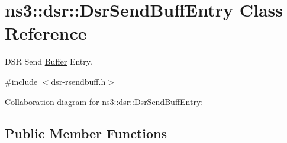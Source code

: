 \hypertarget{classns3_1_1dsr_1_1DsrSendBuffEntry}{}\section{ns3\+:\+:dsr\+:\+:Dsr\+Send\+Buff\+Entry Class Reference}
\label{classns3_1_1dsr_1_1DsrSendBuffEntry}


D\+SR Send \hyperlink{classns3_1_1Buffer}{Buffer} Entry.  




{\ttfamily \#include $<$dsr-\/rsendbuff.\+h$>$}



Collaboration diagram for ns3\+:\+:dsr\+:\+:Dsr\+Send\+Buff\+Entry\+:
\subsection*{Public Member Functions}
